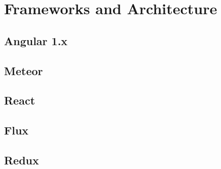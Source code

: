

\section{Frameworks and Architecture}
\subsection{Angular 1.x}

\subsection{Meteor}


\subsection{React}

\subsection{Flux}

\subsection{Redux}\label{ref:redux}



